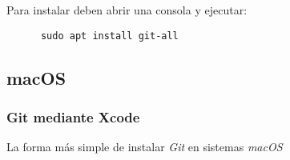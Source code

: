     Para instalar deben abrir una consola y ejecutar:
    \begin{verbatim}
      sudo apt install git-all 
    \end{verbatim}

  \subsection{macOS}
    \subsubsection{Git mediante Xcode}
      La forma más simple de instalar \textit{Git} en sistemas \textit{macOS}
      
